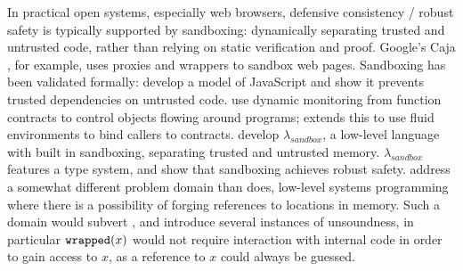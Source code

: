 In practical open systems, especially web browsers, defensive
consistency / robust safety is typically supported by sandboxing: dynamically separating
trusted and untrusted code, rather than relying on static verification
and proof.
Google's Caja \cite{Caja}, for example, uses proxies and wrappers to
sandbox web pages.
Sandboxing has been validated
formally:  \cite{mmt-oakland10} develop a model of
JavaScript and show it prevents trusted dependencies on untrusted code.
%
\cite{DPCC14} use dynamic monitoring from function contracts to
control objects flowing around programs; 
\cite{AuthContract} extends this to use fluid 
environments to bind callers to contracts.
%
\cite{sandbox} develop $\lambda_{sandbox}$, a low-level language with 
built in sandboxing, separating trusted and
untrusted memory. $\lambda_{sandbox}$ features a type system,
and \citeauthor{sandbox} show that sandboxing achieves robust safety.
\citeauthor{sandbox} address a somewhat different
problem domain than \Nec does, low-level systems programming where 
there is a possibility of forging references to locations in memory. Such a domain
would subvert \Nec, and introduce several instances of unsoundness, in particular
$\texttt{wrapped}( x )$ would not require interaction with internal code in order to 
gain access to $x$, as a reference to $x$ could always be guessed.






